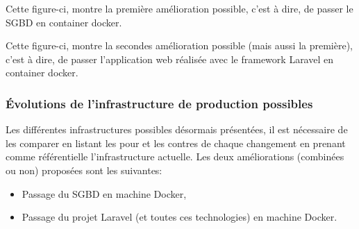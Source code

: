 \documentclass[
    iai, %
    il, %
]{heig-tb}
\begin{document}
Cette figure-ci, montre la première amélioration possible, c'est à dire, de passer le SGBD en container docker.

Cette figure-ci, montre la secondes amélioration possible (mais aussi la première), c'est à dire, de passer l'application web réalisée avec le framework Laravel en container docker.

\subsubsection{Évolutions de l'infrastructure de production possibles}
Les différentes infrastructures possibles désormais présentées, il est nécessaire de les comparer en listant les pour et les contres de chaque changement en prenant comme référentielle l'infrastructure actuelle.
Les deux améliorations (combinées ou non) proposées sont les suivantes:
\begin{itemize}
    \item Passage du SGBD en machine Docker,
    \item Passage du projet Laravel (et toutes ces technologies) en machine Docker.
\end{itemize}
\end{document}
